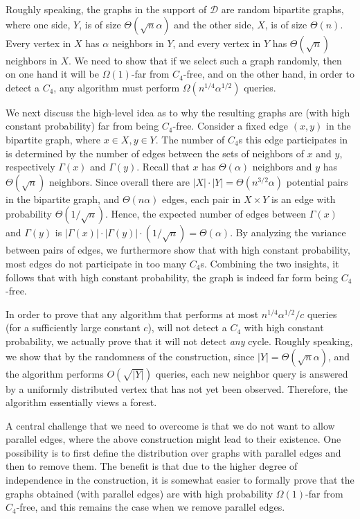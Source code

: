 \documentclass{article}
\newcommand{\calD}{{\mathcal{D}}}
\begin{document}
Roughly speaking, the graphs in the support of $\calD$ are random bipartite graphs, where one side, $Y$, is of size $\Theta(\sqrt{n}\alpha)$ and the other side, $X$, is of size $\Theta(n)$. Every vertex in $X$ has $\alpha$ neighbors in $Y$, and every vertex in $Y$ has $\Theta(\sqrt{n})$ neighbors in $X$. We need to show that if we select such a graph randomly, then on one hand it will be $\Omega(1)$-far from $C_4$-free, and on the other hand, in order to detect a $C_4$, any algorithm must perform $\Omega(n^{1/4}\alpha^{1/2})$ queries.


We next discuss the high-level idea as to why the resulting graphs are (with high constant probability) far from being $C_4$-free. Consider a fixed edge $(x,y)$ in the bipartite graph, where $x\in X, y\in Y$. The number of $C_4$s this edge participates in is determined by the number of edges between the sets of neighbors of $x$ and $y$, respectively $\Gamma(x)$ and $\Gamma(y)$. Recall that $x$ has $\Theta(\alpha)$ neighbors and $y$ has $\Theta(\sqrt n)$ neighbors. Since overall there are $|X|\cdot |Y|=\Theta(n^{3/2}\alpha)$ potential pairs in the bipartite graph, and $\Theta(n\alpha)$ edges, each pair in $X \times Y$ is an edge with probability $\Theta(1/\sqrt n)$. Hence, the expected number of edges between $\Gamma(x)$ and $\Gamma(y)$ is $|\Gamma(x)| \cdot |\Gamma(y)| \cdot (1/\sqrt n)=\Theta(\alpha)$. By analyzing the variance between pairs of edges, we  furthermore show that with high constant probability, most edges do not participate  in too many $C_4$s. Combining the two insights, it follows that with high constant probability, the graph is indeed far form being $C_4$-free.

 
In order to prove that any algorithm that performs at most  $n^{1/4}\alpha^{1/2}/c$   queries (for a sufficiently large constant $c$), will not detect a $C_4$ with high constant probability, we actually prove that it will not detect \emph{any} cycle.  Roughly speaking, we show that by the randomness of the construction, 
since $|Y|=\Theta(\sqrt n \alpha)$, and the algorithm performs $O(\sqrt{|Y|})$ queries,
each new neighbor query is answered by a uniformly   distributed vertex that has not yet been observed. Therefore, the algorithm essentially views a forest. 



A central challenge that we need to overcome is that we do not want to allow parallel edges, where the above construction might lead to their existence. One possibility is to first define the distribution over graphs with parallel edges and then to remove them. The benefit is that due to the higher degree of independence in the construction, it is somewhat easier to formally prove that the graphs obtained (with parallel edges) are with high probability $\Omega(1)$-far from $C_4$-free, and this remains the case when we remove parallel edges.
\end{document}
